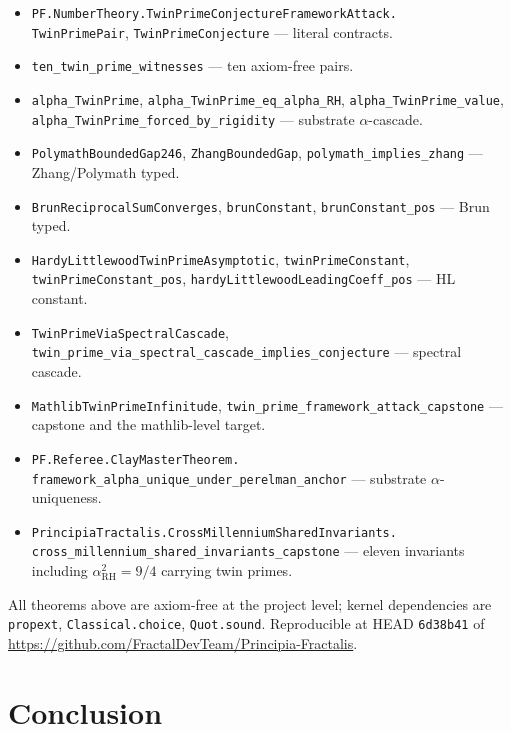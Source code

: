 \documentclass[11pt,a4paper]{article}
\theoremstyle{plain}
\theoremstyle{definition}
\begin{document}
\begin{itemize}[leftmargin=*,nosep]
\item \texttt{PF.NumberTheory.TwinPrimeConjectureFrameworkAttack.\\
  TwinPrimePair}, \texttt{TwinPrimeConjecture} --- literal contracts.
\item \texttt{ten\_twin\_prime\_witnesses} --- ten axiom-free pairs.
\item \texttt{alpha\_TwinPrime}, \texttt{alpha\_TwinPrime\_eq\_alpha\_RH},
  \texttt{alpha\_TwinPrime\_value},
  \texttt{alpha\_TwinPrime\_forced\_by\_rigidity}
  --- substrate $\alpha$-cascade.
\item \texttt{PolymathBoundedGap246},
  \texttt{ZhangBoundedGap},
  \texttt{polymath\_implies\_zhang} --- Zhang/Polymath typed.
\item \texttt{BrunReciprocalSumConverges},
  \texttt{brunConstant}, \texttt{brunConstant\_pos} --- Brun typed.
\item \texttt{HardyLittlewoodTwinPrimeAsymptotic},
  \texttt{twinPrimeConstant}, \texttt{twinPrimeConstant\_pos},
  \texttt{hardyLittlewoodLeadingCoeff\_pos} --- HL constant.
\item \texttt{TwinPrimeViaSpectralCascade},
  \texttt{twin\_prime\_via\_spectral\_cascade\_implies\_conjecture}
  --- spectral cascade.
\item \texttt{MathlibTwinPrimeInfinitude},
  \texttt{twin\_prime\_framework\_attack\_capstone}
  --- capstone and the mathlib-level target.
\item \texttt{PF.Referee.ClayMasterTheorem.\\
  framework\_alpha\_unique\_under\_perelman\_anchor}
  --- substrate $\alpha$-uniqueness.
\item \texttt{PrincipiaTractalis.CrossMillenniumSharedInvariants.\\
  cross\_millennium\_shared\_invariants\_capstone}
  --- eleven invariants including $\alpha_{\mathrm{RH}}^{2} = 9/4$
  carrying twin primes.
\end{itemize}

All theorems above are axiom-free at the project level; kernel
dependencies are \texttt{propext}, \texttt{Classical.choice},
\texttt{Quot.sound}. Reproducible at HEAD \texttt{6d38b41} of
\url{https://github.com/FractalDevTeam/Principia-Fractalis}.

\section{Conclusion}
\label{sec:conclusion}
\end{document}
